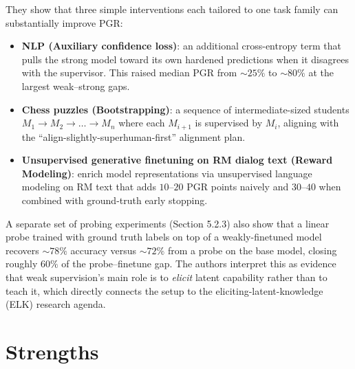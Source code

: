 \documentclass{article}
\begin{document}
They show that three simple interventions each tailored to one task family can substantially improve PGR:
\begin{itemize}[leftmargin=*]
  \item \textbf{NLP (Auxiliary confidence loss)}: an additional cross-entropy term that pulls the strong model toward its own hardened predictions when it disagrees with the supervisor. This raised median PGR from $\sim$$25\%$ to $\sim$$80\%$ at the largest weak--strong gaps.
  \item \textbf{Chess puzzles (Bootstrapping)}: a sequence of intermediate-sized students $M_1 \to M_2 \to \dots \to M_n$ where each $M_{i+1}$ is supervised by $M_i$,  aligning with the ``align-slightly-superhuman-first'' alignment plan.
  \item \textbf{Unsupervised generative finetuning on RM dialog text (Reward Modeling)}: enrich model representations via unsupervised language modeling on RM text that adds $10$--$20$ PGR points naively and $30$--$40$ when combined with ground-truth early stopping.
\end{itemize}

A separate set of probing experiments (Section 5.2.3) also show that a linear probe trained with ground truth labels on top of a weakly-finetuned model recovers $\sim$$78\%$ accuracy versus $\sim$$72\%$ from a probe on the base model, closing roughly $60\%$ of the probe--finetune gap. The authors interpret this as evidence that weak supervision's main role is to \textit{elicit} latent capability rather than to teach it, which directly connects the setup to the eliciting-latent-knowledge (ELK) research agenda.

\section{Strengths}
\end{document}
